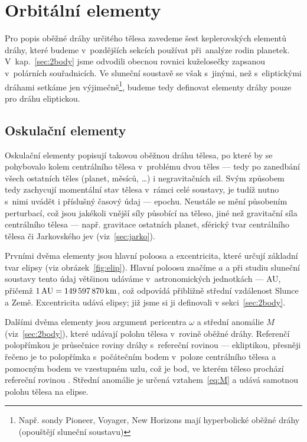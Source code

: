 \documentclass[A4paper, 12pt, oneside]{book}%
\begin{document}
\section{Orbitální elementy} \label{sec:orbelem}
Pro popis oběžné dráhy určitého tělesa zavedeme šest keplerovských elementů dráhy, které budeme v~pozdějších sekcích používat při~analýze rodin planetek. V~kap.~\ref{sec:2body} jsme odvodili obecnou rovnici kuželosečky zapsanou v~polárních souřadnicích. Ve sluneční soustavě se však s~jinými, než s~eliptickými dráhami setkáme jen výjimečně\footnote{Např. sondy Pioneer, Voyager, New Horizons mají hyperbolické oběžné dráhy (opouštějí sluneční soustavu)}, budeme tedy definovat elementy dráhy pouze pro dráhu eliptickou.
\subsection{Oskulační elementy}
Oskulační elementy popisují takovou oběžnou dráhu tělesa, po které by se pohybovalo kolem centrálního tělesa v~problému dvou těles --- tedy po zanedbání všech ostatních těles (planet, měsíců, \ldots) i negravitačních sil. Svým způsobem tedy zachycují momentální stav tělesa v~rámci celé soustavy, je tudíž nutno s~nimi uvádět i příslušný časový údaj --- epochu. Neustále se mění působením perturbací, což jsou jakékoli vnější síly působící na těleso, jiné než gravitační síla centrálního tělesa --- např. gravitace ostatních planet, sférický tvar centrálního tělesa či Jarkovského jev (viz~\ref{sec:jarko}).

Prvními dvěma elementy jsou hlavní poloosa a excentricita, které určují základní tvar elipsy (viz obrázek~\ref{fig:elip}). Hlavní poloosu značíme $a$ a při studiu sluneční soustavy tento údaj většinou udáváme v~astronomických jednotkách --- AU, přičemž $1\, {\rm AU} = 149\,597\,870\,{\rm km}$, což odpovídá přibližně střední vzdálenost Slunce a Země. Excentricita udává  elipsy; již jsme si ji definovali v sekci~\ref{sec:2body}.

Dalšími dvěma elementy jsou argument pericentra $\omega$ a střední anomálie $M$ (viz~\ref{sec:2body}), které udávají polohu tělesa v~rovině oběžné dráhy. Referenčí polopřímkou je průsečnice roviny dráhy s~refereční rovinou --- ekliptikou, přesněji řečeno je to polopřímka s~počátečním bodem v~poloze centrálního tělesa a pomocným bodem ve vzestupném uzlu, což je bod, ve kterém těleso prochází refereční rovinou . Střední anomálie je určená vztahem~\eqref{eq:M} a udává samotnou polohu tělesa na elipse.
\end{document}
